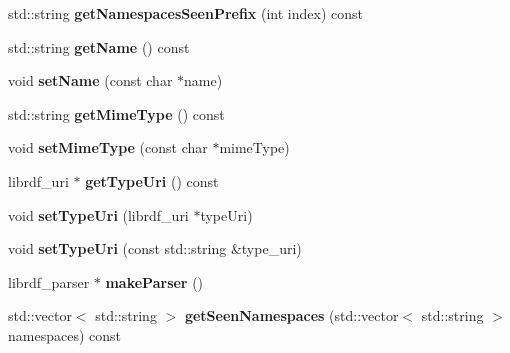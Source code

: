 \begin{DoxyCompactItemize}
\item 
\mbox{\label{classredland_1_1LibrdfParser_a89d1335343c9999db8207866de8202c1}} 
std\+::string {\bfseries get\+Namespaces\+Seen\+Prefix} (int index) const
\item 
\mbox{\label{classredland_1_1LibrdfParser_aaa813cd98f57703e2168e81cf1c8b356}} 
std\+::string {\bfseries get\+Name} () const
\item 
\mbox{\label{classredland_1_1LibrdfParser_a152feb7bf2aa291fc7ec48fe2769265a}} 
void {\bfseries set\+Name} (const char $\ast$name)
\item 
\mbox{\label{classredland_1_1LibrdfParser_aacf1514391f15d3687a35352f1c0da3d}} 
std\+::string {\bfseries get\+Mime\+Type} () const
\item 
\mbox{\label{classredland_1_1LibrdfParser_a8fe0e89950e9b71f86fa58e10eb475d8}} 
void {\bfseries set\+Mime\+Type} (const char $\ast$mime\+Type)
\item 
\mbox{\label{classredland_1_1LibrdfParser_ae6f233d632e3a515afe7afceabf4e5ef}} 
librdf\+\_\+uri $\ast$ {\bfseries get\+Type\+Uri} () const
\item 
\mbox{\label{classredland_1_1LibrdfParser_a81d772e0be266b00bf840fd9dbeab8d1}} 
void {\bfseries set\+Type\+Uri} (librdf\+\_\+uri $\ast$type\+Uri)
\item 
\mbox{\label{classredland_1_1LibrdfParser_a76ecf31cd9fb96ba4e10a35f383e47fc}} 
void {\bfseries set\+Type\+Uri} (const std\+::string \&type\+\_\+uri)
\item 
\mbox{\label{classredland_1_1LibrdfParser_a8055c22ada8b852112f4f011d9fa5abe}} 
librdf\+\_\+parser $\ast$ {\bfseries make\+Parser} ()
\item 
\mbox{\label{classredland_1_1LibrdfParser_abca88f90c6d20573961b10800f9b9047}} 
std\+::vector$<$ std\+::string $>$ {\bfseries get\+Seen\+Namespaces} (std\+::vector$<$ std\+::string $>$ namespaces) const
\end{DoxyCompactItemize}
